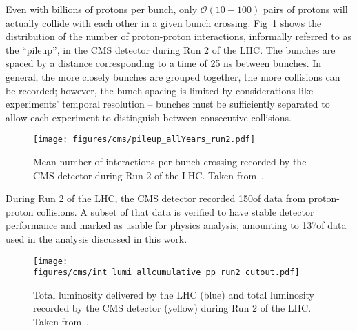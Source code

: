 Even with billions of protons per bunch, only $\mathcal O(10-100)$ pairs of protons will actually collide with each other in a given bunch crossing. %
Fig~\ref{fig:cms_pileup} shows the distribution of the number of proton-proton interactions, informally referred to as the ``pileup'', in the CMS detector during Run 2 of the LHC. 
The bunches are spaced by a distance corresponding to a time of 25 ns between bunches.
In general, the more closely bunches are grouped together, the more collisions can be recorded; however, the bunch spacing is limited by considerations like experiments' temporal resolution -- bunches must be sufficiently separated to allow each experiment to distinguish between consecutive collisions.

\begin{figure} [htbp!]
    \centering
    \texttt{[image: figures/cms/pileup\_allYears\_run2.pdf]}
    \caption{Mean number of interactions per bunch crossing recorded by the CMS detector during Run 2 of the LHC. Taken from~\cite{public_lumi}.}
    \label{fig:cms_pileup}
\end{figure}

During Run 2 of the LHC, the CMS detector recorded 150\fbinv of data from proton-proton collisions.
A subset of that data is verified to have stable detector performance and marked as usable for physics analysis, amounting to 137\fbinv of data used in the analysis discussed in this work.

\begin{figure} [htbp!]
    \centering
    \texttt{[image: figures/cms/int\_lumi\_allcumulative\_pp\_run2\_cutout.pdf]}
    \caption{Total luminosity delivered by the LHC (blue) and total luminosity recorded by the CMS detector (yellow) during Run 2 of the LHC. Taken from~\cite{public_lumi}.}
    \label{fig:cms_lumi}
\end{figure}
